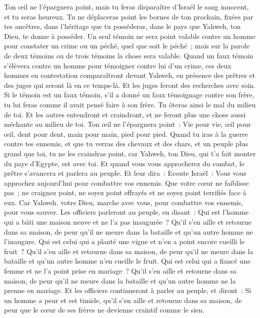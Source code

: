 \begin{multicols}{2}
Ton œil ne l'épargnera point, mais tu feras disparaître d'Israël le sang innocent, et tu seras heureux.
Tu ne déplaceras point les bornes de ton prochain, fixées par tes ancêtres, dans l'héritage que tu posséderas, dans le pays que Yahweh, ton Dieu, te donne à posséder.
Un seul témoin ne sera point valable contre un homme pour constater un crime ou un péché, quel que soit le péché~; mais sur la parole de deux témoins ou de trois témoins la chose sera valable.
Quand un faux témoin s'élèvera contre un homme pour témoigner contre lui d'un crime,
ces deux hommes en contestation comparaîtront devant Yahweh, en présence des prêtres et des juges qui seront là en ce temps-là.
Et les juges feront des recherches avec soin. Si le témoin est un faux témoin, s'il a donné un faux témoignage contre son frère,
tu lui feras comme il avait pensé faire à son frère. Tu ôteras ainsi le mal du milieu de toi.
Et les autres entendront et craindront, et ne feront plus une chose aussi méchante au milieu de toi.
Ton œil ne l'épargnera point~: Vie pour vie, œil pour œil, dent pour dent, main pour main, pied pour pied.
\VerseOne{}Quand tu iras à la guerre contre tes ennemis, et que tu verras des chevaux et des chars, et un peuple plus grand que toi, tu ne les craindras point, car Yahweh, ton Dieu, qui t'a fait monter du pays d'Egypte, est avec toi.
Et quand vous vous approcherez du combat, le prêtre s'avancera et parlera au peuple.
Et leur dira~: Ecoute Israël~: Vous vous approchez aujourd'hui pour combattre vos ennemis. Que votre cœur ne faiblisse pas~; ne craignez point, ne soyez point effrayés et ne soyez point terrifiés face à eux.
Car Yahweh, votre Dieu, marche avec vous, pour combattre vos ennemis, pour vous sauver.
Les officiers parleront au peuple, en disant~: Qui est l'homme qui a bâti une maison neuve et ne l'a pas inaugurée~? Qu'il s'en aille et retourne dans sa maison, de peur qu'il ne meure dans la bataille et qu'un autre homme ne l'inaugure.
Qui est celui qui a planté une vigne et n'en a point encore cueilli le fruit~? Qu'il s'en aille et retourne dans sa maison, de peur qu'il ne meure dans la bataille et qu'un autre homme n'en cueille le fruit.
Qui est celui qui a fiancé une femme et ne l'a point prise en mariage~? Qu'il s'en aille et retourne dans sa maison, de peur qu'il ne meure dans la bataille et qu'un autre homme ne la prenne en mariage.
Et les officiers continueront à parler au peuple, et diront~: Si un homme a peur et est timide, qu'il s'en aille et retourne dans sa maison, de peur que le cœur de ses frères ne devienne craintif comme le sien.

\end{multicols}
